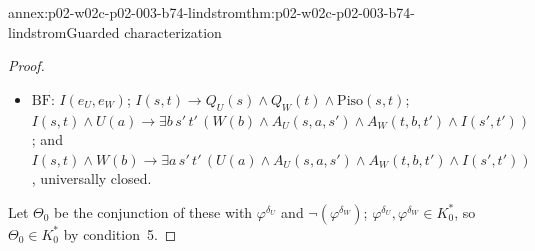 \begin{annexitem}{annex:p02-w02c-p02-003-b74-lindstrom}{thm:p02-w02c-p02-003-b74-lindstrom}{Guarded characterization}
\begin{proof}
\begin{itemize}
      \(h_{s,t}\) is functional and one-one; for each relation symbol
      \(R\in L\) other than \(\mathbf V\), \(\bigwedge_jH(s,t,x_j,y_j)\to
      (R(\bar x)\leftrightarrow R'(\bar y))\); for each \(n\)-ary function
      symbol \(f\),
      \[\textstyle\bigwedge_jH(s,t,x_j,y_j)\land H(s,t,x,y)\to
      (f(\bar x)=x\leftrightarrow f'(\bar y)=y);\]
      for each constant symbol
      \(c\), \(H(s,t,x,y)\to(c=x\leftrightarrow c'=y)\); all universally
      closed except in \(s,t\);
\item \(\mathrm{BF}\): \(I(e_U,e_W)\); \(I(s,t)\to Q_U(s)\land Q_W(t)\land
      \mathrm{Piso}(s,t)\); \(I(s,t)\land U(a)\to\exists b\,s'\,t'\,(W(b)\land
      A_U(s,a,s')\land A_W(t,b,t')\land I(s',t'))\); and
      \(I(s,t)\land W(b)\to\exists a\,s'\,t'\,(U(a)\land A_U(s,a,s')\land
      A_W(t,b,t')\land I(s',t'))\), universally closed.
\end{itemize}
Let \(\Theta_0\) be the conjunction of these with \(\varphi^{\delta_U}\)
and \(\neg(\varphi^{\delta_W})\); \(\varphi^{\delta_U},\varphi^{\delta_W}\in
K_0^{\ast}\), so \(\Theta_0\in K_0^{\ast}\) by condition~5.


\end{proof}
\end{annexitem}
